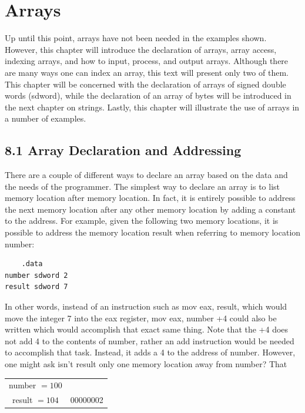 \documentclass[10pt]{article}
\begin{document}
\section*{Arrays}
Up until this point, arrays have not been needed in the examples shown. However, this chapter will introduce the declaration of arrays, array access, indexing arrays, and how to input, process, and output arrays. Although there are many ways one can index an array, this text will present only two of them. This chapter will be concerned with the declaration of arrays of signed double words (sdword), while the declaration of an array of bytes will be introduced in the next chapter on strings. Lastly, this chapter will illustrate the use of arrays in a number of examples.

\subsection*{8.1 Array Declaration and Addressing}
There are a couple of different ways to declare an array based on the data and the needs of the programmer. The simplest way to declare an array is to list memory location after memory location. In fact, it is entirely possible to address the next memory location after any other memory location by adding a constant to the address. For example, given the following two memory locations, it is possible to address the memory location result when referring to memory location number:

\begin{verbatim}
    .data
number sdword 2
result sdword 7
\end{verbatim}

In other words, instead of an instruction such as mov eax, result, which would move the integer 7 into the eax register, mov eax, number +4 could also be written which would accomplish that exact same thing. Note that the +4 does not add 4 to the contents of number, rather an add instruction would be needed to accomplish that task. Instead, it adds a 4 to the address of number. However, one might ask isn't result only one memory location away from number? That

\begin{center}
\begin{tabular}{c|c|}
number $=100$ &  \\
result $=104$ & 00000002 \\
\hline
\end{tabular}
\end{center}
\end{document}
